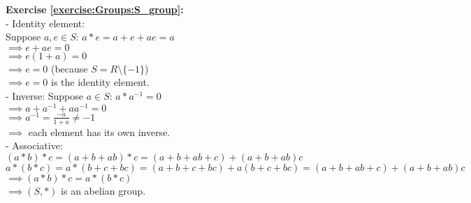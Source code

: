 \noindent\textbf{Exercise \ref{exercise:Groups:S_group}:}
\\
- Identity element:\\
Suppose $a,e\in S$: $a*e=a+e+ae=a$\\
$\implies e+ae=0$\\
$\implies e(1+a)=0$\\
$\implies e=0$ (because $S=R\setminus\{-1\}$)\\
$\implies e=0$ is the identity element.\\
- Inverse: Suppose $a\in S$: $a*a^{-1}=0$\\
$\implies a+a^{-1}+aa^{-1}=0$\\
$\implies a^{-1}=\displaystyle\frac{-a}{1+a}\neq -1$\\
$\implies$  each element has its own inverse.\\
- Associative:\\
$(a*b)*c=(a+b+ab)*c=(a+b+ab+c)+(a+b+ab)c$\\
$a*(b*c)=a*(b+c+bc)=(a+b+c+bc)+a(b+c+bc)=(a+b+ab+c)+(a+b+ab)c$\\
$\implies (a*b)*c=a*(b*c)$\\
$\implies (S,*)$ is an abelian group.\\
\\

